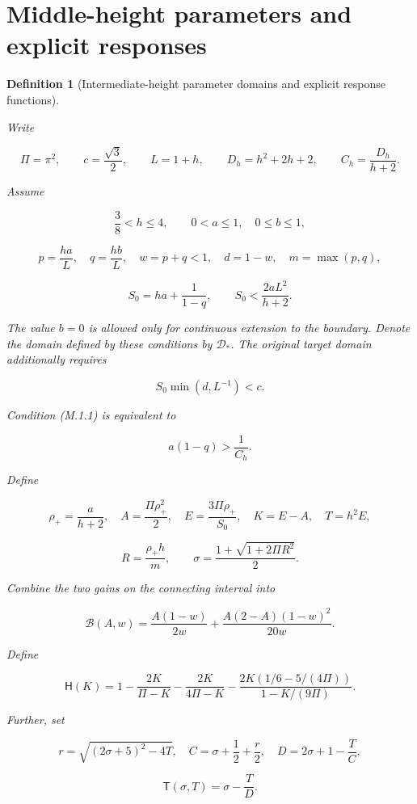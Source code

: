 \documentclass[11pt,a4paper]{article}
\theoremstyle{proofmanuscript}
\newtheorem{definition}[theorem]{Definition}
\begin{document}
\section{Middle-height parameters and explicit responses}

\begin{definition}[Intermediate-height parameter domains and explicit response functions]\label{def-analytic}

Write

\[
\Pi=\pi^2,\qquad c=\frac{\sqrt3}{2},\qquad L=1+h,\qquad
D_h=h^2+2h+2,\qquad C_h=\frac{D_h}{h+2}.
\]

Assume

\[
\frac38<h\le4,\qquad 0<a\le1,\quad0\le b\le1,
\]

\[
p=\frac{ha}{L},\quad q=\frac{hb}{L},\quad
w=p+q<1,\quad d=1-w,\quad m=\max(p,q),
\]

\[
S_0=ha+\frac1{1-q},\qquad
S_0<\frac{2aL^2}{h+2}.                                      \tag{M.1.1}
\]

The value \(b=0\) is allowed only for continuous extension to the boundary. Denote the domain defined by these conditions by \(\mathcal D_*\). The original target domain additionally requires

\[
S_0\min(d,L^{-1})<c.                                       \tag{M.1.2}
\]

Condition (M.1.1) is equivalent to

\[
a(1-q)>\frac1{C_h}.                                        \tag{M.1.3}
\]

Define

\[
\rho_+=\frac a{h+2},\quad A=\frac{\Pi\rho_+^2}{2},\quad
E=\frac{3\Pi\rho_+}{S_0},\quad K=E-A,\quad T=h^2E,
\]

\[
R=\frac{\rho_+h}{m},\qquad
\sigma=\frac{1+\sqrt{1+2\Pi R^2}}2.
\]

Combine the two gains on the connecting interval into

\[
\mathcal B(A,w)=\frac{A(1-w)}{2w}
+\frac{A(2-A)(1-w)^2}{20w}.                                \tag{M.1.4}
\]

Define

\[
\mathsf H(K)=1-\frac{2K}{\Pi-K}-\frac{2K}{4\Pi-K}
-\frac{2K(1/6-5/(4\Pi))}{1-K/(9\Pi)}.                          \tag{M.1.5}
\]

Further, set

\[
r=\sqrt{(2\sigma+5)^2-4T},\quad
C=\sigma+\frac12+\frac r2,\quad
D=2\sigma+1-\frac TC,
\]

\[
\mathsf T(\sigma,T)=\sigma-\frac TD.                       \tag{M.1.6}
\]


\end{definition}
\end{document}
